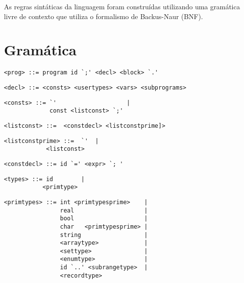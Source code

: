 As regras sintáticas da linguagem foram construídas utilizando uma gramática livre de contexto que utiliza o formalismo de Backus-Naur (BNF).

\section{Gramática}

\begin{footnotesize}
\begin{lstlisting}[frame=single, label={prog}, language=pie]
<prog> ::= program id `;' <decl> <block> `.'
\end{lstlisting}

\begin{lstlisting}[frame=single, label={decl}, language=pie]
<decl> ::= <consts> <usertypes> <vars> <subprograms>
\end{lstlisting}

\begin{lstlisting}[frame=single, label={consts}, language=pie]
<consts> ::= `'                    | 
             const <listconst> `;'
\end{lstlisting}

\begin{lstlisting}[frame=single, label={listconst}, language=pie]
<listconst> ::=  <constdecl> <listconstprime]>
\end{lstlisting}

\begin{lstlisting}[frame=single, label={listconstprime}, language=pie]
<listconstprime> ::=  `'  | 
		    <listconst>
\end{lstlisting}

\begin{lstlisting}[frame=single, label={constdecl}, language=pie]
<constdecl> ::= id `=' <expr> `; '
\end{lstlisting}

\begin{lstlisting}[frame=single, label={types}, language=pie]
<types> ::= id        |
           <primtype>
\end{lstlisting}

\begin{lstlisting}[frame=single, label={primtypes}, language=pie]
<primtypes> ::= int <primtypesprime>    |
                real                    | 
                bool                    |
                char   <primtypesprime> |
                string                  |
                <arraytype>             |
                <settype>               |
                <enumtype>              |
                id `..' <subrangetype>  |
                <recordtype>
\end{lstlisting}


\end{footnotesize}
